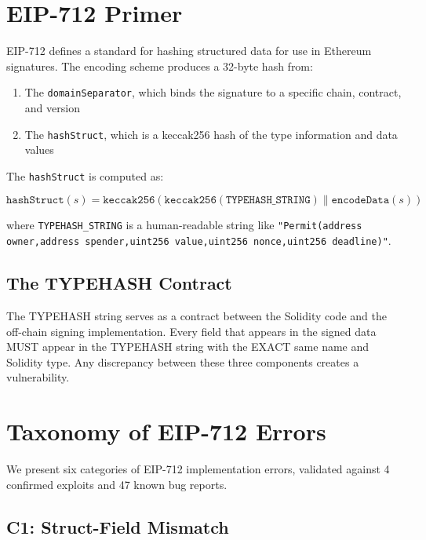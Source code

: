 \documentclass[conference]{IEEEtran}
\begin{document}
\section{EIP-712 Primer}

EIP-712 defines a standard for hashing structured data for use in Ethereum signatures. The encoding scheme produces a 32-byte hash from:

\begin{enumerate}
    \item The \texttt{domainSeparator}, which binds the signature to a specific chain, contract, and version
    \item The \texttt{hashStruct}, which is a keccak256 hash of the type information and data values
\end{enumerate}

The \texttt{hashStruct} is computed as:

\begin{equation}
    \texttt{hashStruct}(s) = \texttt{keccak256}(\texttt{keccak256}(\texttt{TYPEHASH\_STRING}) \parallel \texttt{encodeData}(s))
\end{equation}

where \texttt{TYPEHASH\_STRING} is a human-readable string like \texttt{"Permit(address owner,address spender,uint256 value,uint256 nonce,uint256 deadline)"}.

\subsection{The TYPEHASH Contract}

The TYPEHASH string serves as a contract between the Solidity code and the off-chain signing implementation. Every field that appears in the signed data MUST appear in the TYPEHASH string with the EXACT same name and Solidity type. Any discrepancy between these three components creates a vulnerability.

\section{Taxonomy of EIP-712 Errors}

We present six categories of EIP-712 implementation errors, validated against 4 confirmed exploits and 47 known bug reports.

\subsection{C1: Struct-Field Mismatch}
\end{document}
